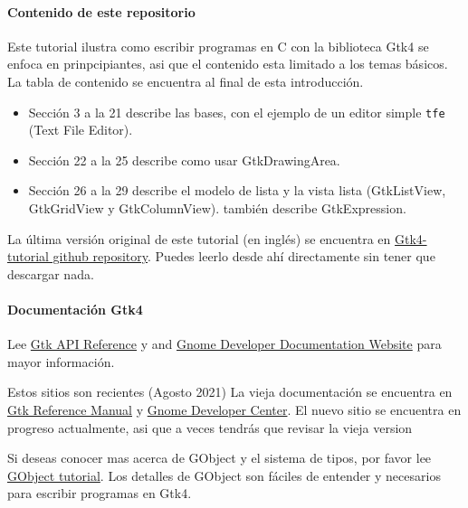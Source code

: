 \hypertarget{contenido-de-este-repositorio}{%
\paragraph{Contenido de este
repositorio}\label{contenido-de-este-repositorio}}

Este tutorial ilustra como escribir programas en C con la biblioteca
Gtk4 se enfoca en prinpcipiantes, asi que el contenido esta limitado a
los temas básicos. La tabla de contenido se encuentra al final de esta
introducción.

\begin{itemize}
\tightlist
\item
  Sección 3 a la 21 describe las bases, con el ejemplo de un editor
  simple \passthrough{\lstinline!tfe!} (Text File Editor).
\item
  Sección 22 a la 25 describe como usar GtkDrawingArea.
\item
  Sección 26 a la 29 describe el modelo de lista y la vista lista
  (GtkListView, GtkGridView y GtkColumnView). también describe
  GtkExpression.
\end{itemize}

La última versión original de este tutorial (en inglés) se encuentra en
\href{https://github.com/ToshioCP/Gtk4-tutorial}{Gtk4-tutorial github
repository}. Puedes leerlo desde ahí directamente sin tener que
descargar nada.

\hypertarget{documentaciuxf3n-gtk4}{%
\paragraph{Documentación Gtk4}\label{documentaciuxf3n-gtk4}}

Lee \href{https://docs.gtk.org/gtk4/index.html}{Gtk API Reference} y and
\href{https://developer.gnome.org/}{Gnome Developer Documentation
Website} para mayor información.

Estos sitios son recientes (Agosto 2021) La vieja documentación se
encuentra en \href{https://developer-old.gnome.org/gtk4/stable/}{Gtk
Reference Manual} y \href{https://developer-old.gnome.org/}{Gnome
Developer Center}. El nuevo sitio se encuentra en progreso actualmente,
asi que a veces tendrás que revisar la vieja version

Si deseas conocer mas acerca de GObject y el sistema de tipos, por favor
lee \href{https://github.com/ToshioCP/Gobject-tutorial}{GObject
tutorial}. Los detalles de GObject son fáciles de entender y necesarios
para escribir programas en Gtk4.

